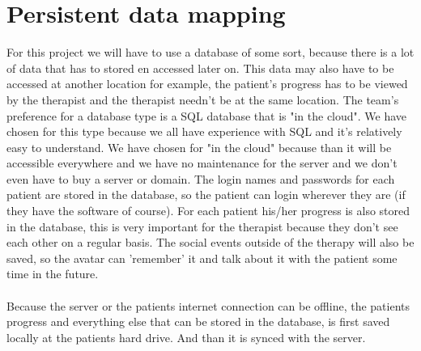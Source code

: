 \section{Persistent data mapping}
\label{sec:datamap}

For this project we will have to use a database of some sort, because there is a lot of data that has to stored en accessed later on. This data may also have to be accessed at another location for example, the patient's progress has to be viewed by the therapist and the therapist needn't be at the same location. The team's preference for a database type is a SQL database that is "in the cloud". We have chosen for this type because we all have experience with SQL and it's relatively easy to understand. We have chosen for "in the cloud" because than it will be accessible everywhere and we have no maintenance for the server and we don't even have to buy a server or domain. 
The login names and passwords for each patient are stored in the database, so the patient can login wherever they are (if they have the software of course). For each patient his/her progress is also stored in the database, this is very important for the therapist because they don't see each other on a regular basis. The social events outside of the therapy will also be saved, so the avatar can 'remember' it and talk about it with the patient some time in the future.

\paragraph{}
Because the server or the patients internet connection can be offline, the patients progress and everything else that can be stored in the database, is first saved locally at the patients hard drive. And than it is synced with the server.